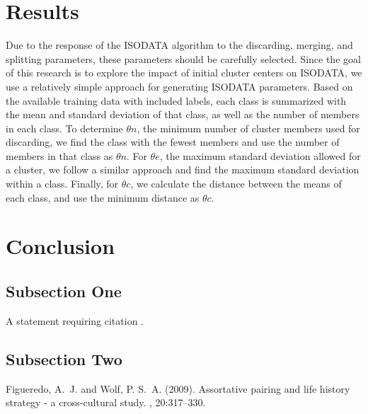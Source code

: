 \documentclass[twoside,twocolumn]{article}
\begin{document}
\section{Results}

Due to the response of the ISODATA algorithm to the discarding, merging, and
splitting parameters, these parameters should be carefully selected. Since the
goal of this research is to explore the impact of initial cluster centers on
ISODATA, we use a relatively simple approach for generating ISODATA parameters.
Based on the available training data with included labels, each class is
summarized with the mean and standard deviation of that class, as well as the
number of members in each class. To determine $\theta n$, the minimum number of
cluster members used for discarding, we find the class with the fewest members
and use the number of members in that class as $\theta n$. For $\theta e$, the
maximum standard deviation allowed for a cluster, we follow a similar approach
and find the maximum standard deviation within a class. Finally, for $\theta c$,
we calculate the distance between the means of each class, and use the minimum
distance as $\theta c$.




\section{Conclusion}

\subsection{Subsection One}

A statement requiring citation \cite{Figueredo:2009dg}.
\blindtext %

\subsection{Subsection Two}

\blindtext %


\begin{thebibliography}{99} %

Figueredo, A.~J. and Wolf, P. S.~A. (2009).
\newblock Assortative pairing and life history strategy - a cross-cultural
  study.
, 20:317--330.
 
\end{thebibliography}

\end{document}
